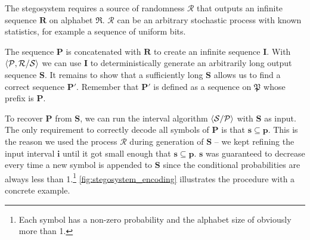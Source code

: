 \documentclass[draft]{IIBproject}
\makeatletter
\DeclarePairedDelimiter{\angled}{\langle}{\rangle}
\DeclareRobustCommand*{\AbbreviationWithDot}[1]{\@ifnextchar{.}{#1}{#1.\@\xspace}}
\DeclareRobustCommand*{\iid}{\AbbreviationWithDot{i.i.d}}
\DeclareRobustCommand{\intervalAlgorithm}[2]{$\angled{\mathcal{#1} / \mathcal{#2}}$\@\xspace}
\makeatother
\begin{document}
The stegosystem requires a source of randomness $\mathcal R$ that outputs an infinite sequence $\mathbf R$ on alphabet $\mathfrak R$. $\mathcal R$ can be an arbitrary stochastic process with known statistics, for example a sequence of \iid uniform bits.

The sequence $\mathbf P$ is concatenated with $\mathbf R$ to create an infinite sequence $\mathbf I$. With \intervalAlgorithm{P,R}{S} we can use $\mathbf I$ to deterministically generate an arbitrarily long output sequence $\mathbf S$. It remains to show that a sufficiently long $\mathbf S$ allows us to find a correct sequence $\mathbf P'$. Remember that $\mathbf{P'}$ is defined as a sequence on $\mathfrak P$ whose prefix is $\mathbf P$.

To recover $\mathbf P$ from $\mathbf S$, we can run the interval algorithm \intervalAlgorithm{S}{P} with $\mathbf S$ as input. The only requirement to correctly decode all symbols of $\mathbf P$ is that $\mathbf s \subseteq \mathbf p$. This is the reason we used the process $\mathcal R$ during generation of $\mathbf S$ -- we kept refining the input interval $\mathbf i$ until it got small enough that $\mathbf s \subseteq \mathbf p$. $\mathbf s$ was guaranteed to decrease every time a new symbol is appended to $\mathbf S$ since the conditional probabilities are always less than 1.\footnote{Each symbol has a non-zero probability and the alphabet size of obviously more than 1.} \cref{fig:stegosystem_encoding} illustrates the procedure with a concrete example.
\end{document}
